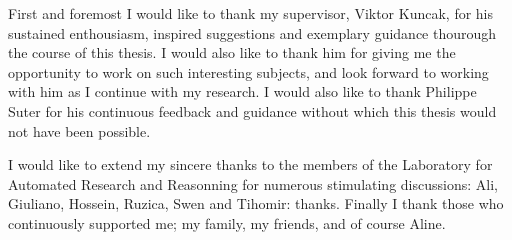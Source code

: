 First and foremost I would like to thank my supervisor, Viktor Kuncak, for his
sustained enthousiasm, inspired suggestions and exemplary guidance thourough
the course of this thesis. I would also like to thank him for giving me the
opportunity to work on such interesting subjects, and look forward to working
with him as I continue with my research. I would also like to thank Philippe
Suter for his continuous feedback and guidance without which this thesis would
not have been possible.

I would like to extend my sincere thanks to the members of the Laboratory for
Automated Research and Reasonning for numerous stimulating discussions: Ali,
Giuliano, Hossein, Ruzica, Swen and Tihomir: thanks. Finally I thank those who
continuously supported me; my family, my friends, and of course Aline.

